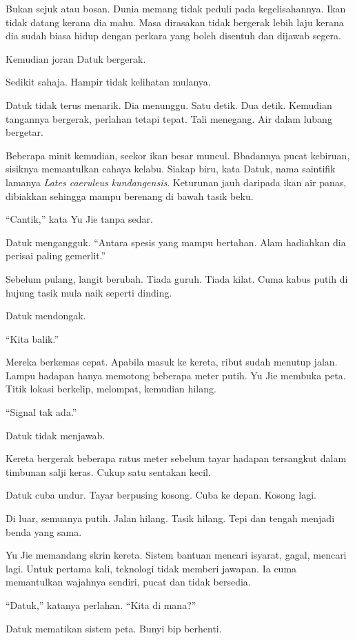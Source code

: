 \documentclass[
  11pt,
  a5paper,
  openany,
  oneside]{book}
\begin{document}
Bukan sejuk atau bosan. Dunia memang tidak peduli pada kegelisahannya.
Ikan tidak datang kerana dia mahu. Masa dirasakan tidak bergerak lebih
laju kerana dia sudah biasa hidup dengan perkara yang boleh disentuh dan
dijawab segera.

Kemudian joran Datuk bergerak.

Sedikit sahaja. Hampir tidak kelihatan mulanya.

Datuk tidak terus menarik. Dia menunggu. Satu detik. Dua detik. Kemudian
tangannya bergerak, perlahan tetapi tepat. Tali menegang. Air dalam
lubang bergetar.

Beberapa minit kemudian, seekor ikan besar muncul. Bbadannya pucat
kebiruan, sisiknya memantulkan cahaya kelabu. Siakap biru, kata Datuk,
nama saintifik lamanya \emph{Lates caeruleus kundangensis}. Keturunan
jauh daripada ikan air panas, dibiakkan sehingga mampu berenang di bawah
tasik beku.

``Cantik,'' kata Yu Jie tanpa sedar.

Datuk mengangguk. ``Antara spesis yang mampu bertahan. Alam hadiahkan
dia perisai paling gemerlit.''

Sebelum pulang, langit berubah. Tiada guruh. Tiada kilat. Cuma kabus
putih di hujung tasik mula naik seperti dinding.

Datuk mendongak.

``Kita balik.''

Mereka berkemas cepat. Apabila masuk ke kereta, ribut sudah menutup
jalan. Lampu hadapan hanya memotong beberapa meter putih. Yu Jie membuka
peta. Titik lokasi berkelip, melompat, kemudian hilang.

``Signal tak ada.''

Datuk tidak menjawab.

Kereta bergerak beberapa ratus meter sebelum tayar hadapan tersangkut
dalam timbunan salji keras. Cukup satu sentakan kecil.

Datuk cuba undur. Tayar berpusing kosong. Cuba ke depan. Kosong lagi.

Di luar, semuanya putih. Jalan hilang. Tasik hilang. Tepi dan tengah
menjadi benda yang sama.

Yu Jie memandang skrin kereta. Sistem bantuan mencari isyarat, gagal,
mencari lagi. Untuk pertama kali, teknologi tidak memberi jawapan. Ia
cuma memantulkan wajahnya sendiri, pucat dan tidak bersedia.

``Datuk,'' katanya perlahan. ``Kita di mana?''

Datuk mematikan sistem peta. Bunyi bip berhenti.
\end{document}
